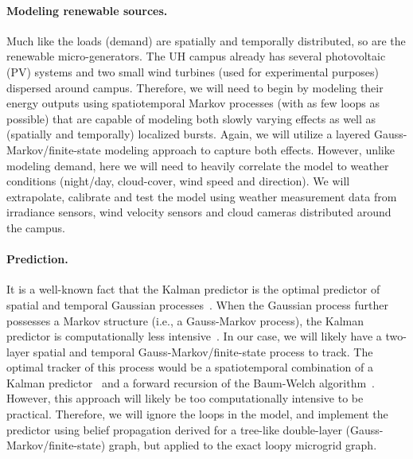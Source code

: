 \paragraph{Modeling renewable sources.} Much like the loads (demand) are spatially and temporally distributed, so are the renewable micro-generators. The UH campus already has several photovoltaic (PV) systems and two small wind turbines (used for experimental purposes) dispersed around campus.  Therefore, we will need to begin by modeling their energy outputs using spatiotemporal Markov processes (with as few loops as possible) that are capable of modeling both slowly varying effects as well as (spatially and temporally) localized bursts. Again, we will utilize a layered Gauss-Markov/finite-state modeling approach to capture both effects. However, unlike modeling demand, here we will need to heavily correlate the model to weather conditions (night/day, cloud-cover, wind speed and direction). We will extrapolate, calibrate and test the model using weather measurement data from irradiance sensors, wind velocity sensors and cloud cameras distributed around the campus.

\paragraph{Prediction.} It is a well-known fact that the Kalman predictor
is the optimal predictor of spatial and temporal Gaussian
processes~\cite{Kalman60,Kalman_Bucy61,Kailath68}. When the Gaussian
process further possesses a Markov structure (i.e., a Gauss-Markov
process), the Kalman predictor is computationally less
intensive~\cite{Kschischang01,Loeliger07}. In our case, we will
likely have a two-layer spatial and temporal
Gauss-Markov/finite-state process to track. The optimal tracker of
this process would be a spatiotemporal combination of a Kalman
predictor~\cite{Kalman60,Kalman_Bucy61} and a forward recursion of
the Baum-Welch algorithm~\cite{Baum66,Bahl74}. However, this
approach will likely be too computationally intensive to be
practical. Therefore, we will ignore the loops in the model, and
implement the predictor using belief propagation derived for a
tree-like double-layer (Gauss-Markov/finite-state) graph, but
applied to the exact loopy microgrid graph.

